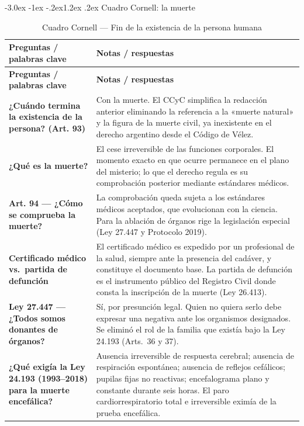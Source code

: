 \documentclass[12pt,oneside]{book}
\makeatletter
\renewcommand\section{\@startsection{section}{1}{\z@}%
  {-3.0ex \@plus -1ex \@minus -.2ex}{1.2ex \@plus .2ex}%
  {\normalfont\large\bfseries\color{acento}}}
\makeatother
\begin{document}
\section{Cuadro Cornell: la muerte}
\begin{longtable}{
    >{\raggedright\arraybackslash}p{}
    >{\raggedright\arraybackslash}p{}
}
\caption{Cuadro Cornell --- Fin de la existencia de la persona humana} \\
\toprule
\textbf{Preguntas / palabras clave} & \textbf{Notas / respuestas} \\
\midrule
\endfirsthead

\toprule
\textbf{Preguntas / palabras clave} & \textbf{Notas / respuestas} \\
\midrule
\endhead

\textbf{¿Cuándo termina la existencia de la persona? (Art. 93)} &
Con la muerte. El CCyC simplifica la redacción anterior eliminando la referencia a la «muerte natural» y la figura de la muerte civil, ya inexistente en el derecho argentino desde el Código de Vélez. \\

\textbf{¿Qué es la muerte?} &
El cese irreversible de las funciones corporales. El momento exacto en que ocurre permanece en el plano del misterio; lo que el derecho regula es su comprobación posterior mediante estándares médicos. \\

\textbf{Art. 94 --- ¿Cómo se comprueba la muerte?} &
La comprobación queda sujeta a los estándares médicos aceptados, que evolucionan con la ciencia. Para la ablación de órganos rige la legislación especial (Ley 27.447 y Protocolo 2019). \\

\textbf{Certificado médico vs.\ partida de defunción} &
El certificado médico es expedido por un profesional de la salud, siempre ante la presencia del cadáver, y constituye el documento base. La partida de defunción es el instrumento público del Registro Civil donde consta la inscripción de la muerte (Ley 26.413). \\

\textbf{Ley 27.447 --- ¿Todos somos donantes de órganos?} &
Sí, por presunción legal. Quien no quiera serlo debe expresar una negativa ante los organismos designados. Se eliminó el rol de la familia que existía bajo la Ley 24.193 (Arts.\ 36 y 37). \\

\textbf{¿Qué exigía la Ley 24.193 (1993--2018) para la muerte encefálica?} &
Ausencia irreversible de respuesta cerebral; ausencia de respiración espontánea; ausencia de reflejos cefálicos; pupilas fijas no reactivas; encefalograma plano y constante durante seis horas. El paro cardiorrespiratorio total e irreversible eximía de la prueba encefálica. \\


\end{longtable}
\end{document}

